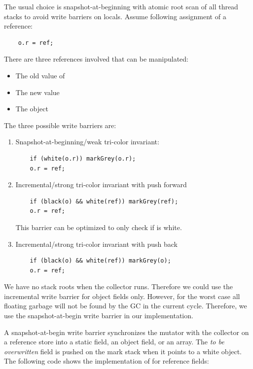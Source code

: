 The usual choice is snapshot-at-beginning with atomic root scan of
all thread stacks to avoid write barriers on locals. Assume
following assignment of a reference:
\begin{verbatim}
    o.r = ref;
\end{verbatim}
There are three references involved that can be manipulated:
\begin{itemize}
    \item The old value of 
    \item The new value 
    \item The object 
\end{itemize}
The three possible write barriers are:
\begin{enumerate}
    \item
Snapshot-at-beginning/weak tri-color invariant:
\begin{verbatim}
    if (white(o.r)) markGrey(o.r);
    o.r = ref;
\end{verbatim}
    \item
Incremental/strong tri-color invariant with push forward
\begin{verbatim}
    if (black(o) && white(ref)) markGrey(ref);
    o.r = ref;
\end{verbatim}
This barrier can be optimized to only check if  is white.

    \item
Incremental/strong tri-color invariant with push back
\begin{verbatim}
    if (black(o) && white(ref)) markGrey(o);
    o.r = ref;
\end{verbatim}

\end{enumerate}

We have no stack roots when the collector runs. Therefore we could
use the incremental write barrier for object fields only. However,
for the worst case all floating garbage will not be found by the GC
in the current cycle. Therefore, we use the snapshot-at-begin write
barrier in our implementation.



A snapshot-at-begin write barrier synchronizes the mutator with the
collector on a reference store into a static field, an object field,
or an array. The \emph{to be overwritten} field is pushed on the
mark stack when it points to a white object. The following code
shows the implementation of  for reference fields:

